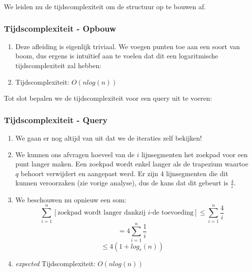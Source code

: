 \documentclass[12pt,a4paper]{article}
\begin{document}
			We leiden nu de tijdscomplexiteit om de structuur op te bouwen af.
			
			\subsubsection{Tijdscomplexiteit - Opbouw}
				\begin{enumerate}
					\item Deze afleiding is eigenlijk triviaal. We voegen punten toe aan een soort van boom, dus ergens is intuïtief aan te voelen dat dit een logaritmische tijdscomplexiteit zal hebben:
					\item Tijdscomplexiteit: $O(n log (n))$
				\end{enumerate}
		
			Tot slot bepalen we de tijdscomplexiteit voor een query uit te voeren:
			
			\subsubsection{Tijdscomplexiteit - Query}
				\begin{enumerate}
					\item We gaan er nog altijd van uit dat we de iteraties zelf bekijken!
					\item We kunnen ons afvragen hoeveel van de $i$ lijnsegmenten het zoekpad voor een punt langer maken. Een zoekpad wordt enkel langer als de trapezium waartoe $q$ behoort verwijdert en aangepast werd. Er zijn 4 lijnsegmenten die dit kunnen veroorzaken (zie vorige analyse), dus de kans dat dit gebeurt is $\frac{4}{i}$.
					\item We beschouwen nu opnieuw een som:
					$$\sum_{i=1}^{n}[\textrm{zoekpad wordt langer dankzij $i$-de toevoeding}] \leq \sum_{i=1}^{n} \frac{4}{i}$$
					$$= 4 \sum_{i=1}^{n}\frac{1}{i}$$
					$$\leq 4(1 + log_e(n))$$
					\item \emph{expected} Tijdscomplexiteit: $O(n log (n))$
				\end{enumerate}
			
\end{document}
